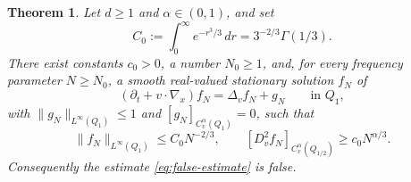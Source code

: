 \documentclass[11pt,reqno]{amsart}
\numberwithin{equation}{section}
\newtheorem{theorem}{Theorem}[section]
\theoremstyle{remark}
\begin{document}
\begin{theorem}\label{thm:main}
Let \(d\ge1\) and \(\alpha\in(0,1)\), and set
\[
   C_0:=\int_0^\infty e^{-r^3/3}\,dr=3^{-2/3}\Gamma(1/3).
\]
There exist constants \(c_0>0\), a number \(N_0\ge1\), and, for every
frequency parameter \(N\ge N_0\), a smooth real-valued stationary solution \(f_N\) of
\begin{equation}\label{eq:kfp-special}
   (\partial_t+v\cdot\nabla_x)f_N=\Delta_v f_N+g_N
   \qquad\text{in }Q_1,
\end{equation}
with \(\|g_N\|_{L^\infty(Q_1)}\le1\) and
\([g_N]_{C_v^\alpha(Q_1)}=0\), such that
\begin{equation}\label{eq:main-bounds}
   \|f_N\|_{L^\infty(Q_1)}\le C_0N^{-2/3},
   \qquad
   [D_v^2f_N]_{C_v^\alpha(Q_{1/2})}\ge c_0N^{\alpha/3}.
\end{equation}
Consequently the estimate \eqref{eq:false-estimate} is false.
\end{theorem}
\end{document}
